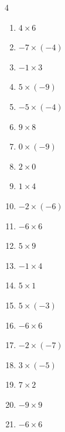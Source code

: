 \begin{multicols}{4}
\begin{enumerate}
  \item $4\times 6$
        \phantom{$=24$}

  \item $-7\times (-4)$
        \phantom{$=28$}

  \item $-1\times 3$
        \phantom{$=-3$}

  \item $5\times (-9)$
        \phantom{$=-45$}

  \item $-5\times (-4)$
        \phantom{$=20$}

  \item $9\times 8$
        \phantom{$=72$}

  \item $0\times (-9)$
        \phantom{$=0$}

  \item $2\times 0$
        \phantom{$=0$}

  \item $1\times 4$
        \phantom{$=4$}

  \item $-2\times (-6)$
        \phantom{$=12$}

  \item $-6\times 6$
        \phantom{$=-36$}

  \item $5\times 9$
        \phantom{$=45$}

  \item $-1\times 4$
        \phantom{$=-4$}

  \item $5\times 1$
        \phantom{$=5$}

  \item $5\times (-3)$
        \phantom{$=-15$}

  \item $-6\times 6$
        \phantom{$=-36$}

  \item $-2\times (-7)$
        \phantom{$=14$}

\columnbreak %

  \item $3\times (-5)$
        \phantom{$=-15$}

  \item $7\times 2$
        \phantom{$=14$}

  \item $-9\times 9$
        \phantom{$=-81$}

  \item $-6\times 6$
        \phantom{$=-36$}


\end{enumerate}
\end{multicols}
